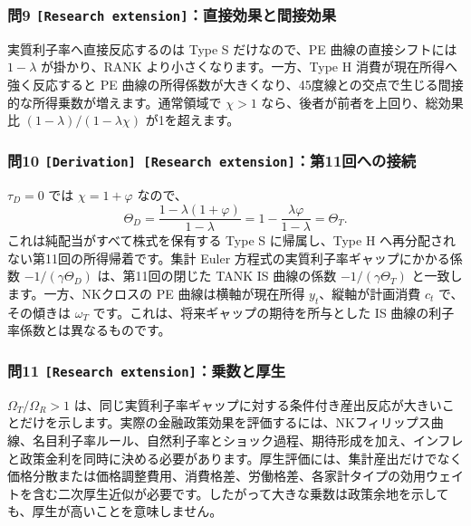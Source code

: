 \documentclass[
  japanese,
  lualatex,
  ja=standard,
  11pt,
  a4paper]{ltjsarticle}
\begin{document}
\subsubsection{\texorpdfstring{問9
\texttt{{[}Research\ extension{]}}：直接効果と間接効果}{問9 {[}Research extension{]}：直接効果と間接効果}}\label{ux554f9-research-extensionux76f4ux63a5ux52b9ux679cux3068ux9593ux63a5ux52b9ux679c}

実質利子率へ直接反応するのは Type S だけなので、PE 曲線の直接シフトには
\(1-\lambda\) が掛かり、RANK より小さくなります。一方、Type H
消費が現在所得へ強く反応すると PE
曲線の所得係数が大きくなり、45度線との交点で生じる間接的な所得乗数が増えます。通常領域で
\(\chi>1\) なら、後者が前者を上回り、総効果比
\((1-\lambda)/(1-\lambda\chi)\) が1を超えます。

\clearpage

\subsubsection{\texorpdfstring{問10
\texttt{{[}Derivation{]}\ {[}Research\ extension{]}}：第11回への接続}{問10 {[}Derivation{]} {[}Research extension{]}：第11回への接続}}\label{ux554f10-derivation-research-extensionux7b2c11ux56deux3078ux306eux63a5ux7d9a}

\(\tau_D=0\) では \(\chi=1+\varphi\) なので、 \[
\Theta_D
=\frac{1-\lambda(1+\varphi)}{1-\lambda}
=1-\frac{\lambda\varphi}{1-\lambda}
=\Theta_T.
\] これは純配当がすべて株式を保有する Type S に帰属し、Type H
へ再分配されない第11回の所得帰着です。集計 Euler
方程式の実質利子率ギャップにかかる係数 \(-1/(\gamma\Theta_D)\)
は、第11回の閉じた TANK IS 曲線の係数 \(-1/(\gamma\Theta_T)\)
と一致します。一方、NKクロスの PE 曲線は横軸が現在所得
\(y_t\)、縦軸が計画消費 \(c_t\) で、その傾きは \(\omega_T\)
です。これは、将来ギャップの期待を所与とした IS
曲線の利子率係数とは異なるものです。

\subsubsection{\texorpdfstring{問11
\texttt{{[}Research\ extension{]}}：乗数と厚生}{問11 {[}Research extension{]}：乗数と厚生}}\label{ux554f11-research-extensionux4e57ux6570ux3068ux539aux751f}

\(\Omega_T/\Omega_R>1\)
は、同じ実質利子率ギャップに対する条件付き産出反応が大きいことだけを示します。実際の金融政策効果を評価するには、NKフィリップス曲線、名目利子率ルール、自然利子率とショック過程、期待形成を加え、インフレと政策金利を同時に決める必要があります。厚生評価には、集計産出だけでなく価格分散または価格調整費用、消費格差、労働格差、各家計タイプの効用ウェイトを含む二次厚生近似が必要です。したがって大きな乗数は政策余地を示しても、厚生が高いことを意味しません。
\end{document}
